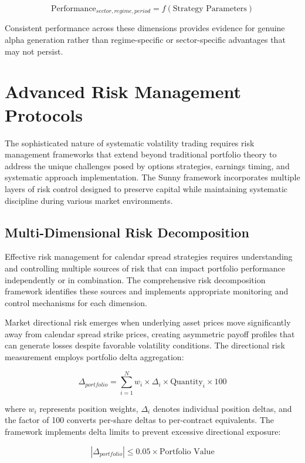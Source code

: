 \documentclass[
  american,
  11pt,
  11pt,
  letterpaper,
  onecolumn]{article}
\begin{document}
\[\text{Performance}_{sector,regime,period} = f(\text{Strategy Parameters})\]

Consistent performance across these dimensions provides evidence for
genuine alpha generation rather than regime-specific or sector-specific
advantages that may not persist.

\section{Advanced Risk Management
Protocols}\label{advanced-risk-management-protocols}

The sophisticated nature of systematic volatility trading requires risk
management frameworks that extend beyond traditional portfolio theory to
address the unique challenges posed by options strategies, earnings
timing, and systematic approach implementation. The Sunny framework
incorporates multiple layers of risk control designed to preserve
capital while maintaining systematic discipline during various market
environments.

\subsection{Multi-Dimensional Risk
Decomposition}\label{multi-dimensional-risk-decomposition}

Effective risk management for calendar spread strategies requires
understanding and controlling multiple sources of risk that can impact
portfolio performance independently or in combination. The comprehensive
risk decomposition framework identifies these sources and implements
appropriate monitoring and control mechanisms for each dimension.

Market directional risk emerges when underlying asset prices move
significantly away from calendar spread strike prices, creating
asymmetric payoff profiles that can generate losses despite favorable
volatility conditions. The directional risk measurement employs
portfolio delta aggregation:

\[\Delta_{portfolio} = \sum_{i=1}^{N} w_i \times \Delta_i \times \text{Quantity}_i \times 100\]

where \(w_i\) represents position weights, \(\Delta_i\) denotes
individual position deltas, and the factor of 100 converts per-share
deltas to per-contract equivalents. The framework implements delta
limits to prevent excessive directional exposure:

\[|\Delta_{portfolio}| \leq 0.05 \times \text{Portfolio Value}\]
\end{document}
